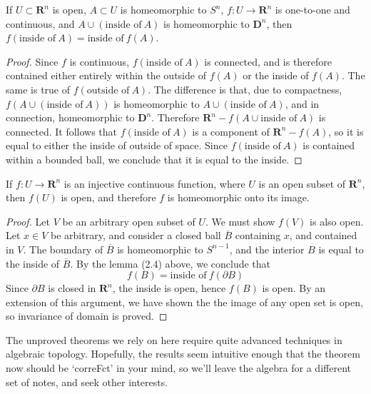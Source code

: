 \begin{lemma}
    If $U \subset \mathbf{R}^n$ is open, $A \subset U$ is homeomorphic to $S^n$, $f:U \to \mathbf{R}^n$ is one-to-one and continuous, and $A \cup (\text{inside of}\ A)$ is homeomorphic to $\mathbf{D}^n$, then $f(\text{inside of}\ A) = \text{inside of}\ f(A)$.
\end{lemma}
\begin{proof}
    Since $f$ is continuous, $f(\text{inside of}\ A)$ is connected, and is therefore contained either entirely within the outside of $f(A)$ or the inside of $f(A)$. The same is true of $f(\text{outside of}\ A)$. The difference is that, due to compactness, $f(A \cup (\text{inside of}\ A))$ is homeomorphic to $A \cup (\text{inside of}\ A)$, and in connection, homeomorphic to $\mathbf{D}^n$. Therefore $\mathbf{R}^n - f(A \cup \text{inside of}\ A)$ is connected. It follows that $f(\text{inside of}\ A)$ is a component of $\mathbf{R}^n - f(A)$, so it is equal to either the inside of outside of space. Since $f(\text{inside of}\ A)$ is contained within a bounded ball, we conclude that it is equal to the inside.
\end{proof}

\begin{theorem}
    If $f:U \to \mathbf{R}^n$ is an injective continuous function, where $U$ is an open subset of $\mathbf{R}^n$, then $f(U)$ is open, and therefore $f$ is homeomorphic onto its image.
\end{theorem}
\begin{proof}
    Let $V$ be an arbitrary open subset of $U$. We must show $f(V)$ is also open. Let $x \in V$ be arbitrary, and consider a closed ball $\overline{B}$ containing $x$, and contained in $V$. The boundary of $\overline{B}$ is homeomorphic to $S^{n-1}$, and the interior $B$ is equal to the inside of $\overline{B}$. By the lemma (2.4) above, we conclude that
    \[ f(B) = \text{inside of}\ f(\partial B) \]
    Since $\partial B$ is closed in $\mathbf{R}^n$, the inside is open, hence $f(B)$ is open. By an extension of this argument, we have shown the the image of any open set is open, so invariance of domain is proved.
\end{proof}

The unproved theorems we rely on here require quite advanced techniques in algebraic topology. Hopefully, the results seem intuitive enough that the theorem now should be `correFct' in your mind, so we'll leave the algebra for a different set of notes, and seek other interests.